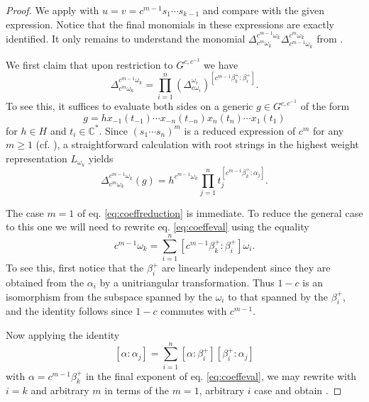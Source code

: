 \documentclass[12pt]{amsart}
\newcommand{\CC}{\mathbb{C}}
\numberwithin{equation}{section}
\begin{document}
  \begin{proof}
    We apply  with $u = v = c^{m-1}s_1 \cdots s_{k-1}$ and compare with the given expression.  Notice that the final monomials in these expressions are exactly identified.  It only remains to understand the monomial $\Delta_{c^m \omega_k}^{c^{m-1} \omega_k}\Delta_{c^{m-1} \omega_k}^{c^m \omega_k}$ from .

    We first claim that upon restriction to $G^{c,c^{-1}}$ we have
    \begin{equation}\label{eq:coeffreduction}
      \Delta_{c^m \omega_k}^{c^{m-1} \omega_k} = 
      \prod_{i=1}^n (\Delta_{c \omega_i}^{\omega_i})^{[c^{m-1}\beta_k^+:\beta_i^+]}.
    \end{equation}
    To see this, it suffices to evaluate both sides on a generic $g \in G^{c,c^{-1}}$ of the form
    \[
      g = hx_{-1}(t_{-1}) \cdots x_{-n}(t_{-n}) x_{n}(t_{n}) \cdots x_{1}(t_{1})
    \]
    for $h \in H$ and $t_i \in \CC^*$.  Since $(s_1 \cdots s_n)^m$ is a reduced expression of $c^m$ for any $m \geq 1$ (cf. \cite{Spe09}), a straightforward calculation with root strings in the highest weight representation $L_{\omega_k}$ yields
    \begin{equation}\label{eq:coeffeval}
      \Delta_{c^m \omega_k}^{c^{m-1}\omega_k}(g) = h^{c^{m-1}\omega_k} \prod_{j=1}^n t_j^{[c^{m-1}\beta_k^+:\alpha_j]}.
    \end{equation}
    
    The case $m=1$ of eq. \eqref{eq:coeffreduction} is immediate.  To reduce the general case to this one we will need to rewrite eq. \eqref{eq:coeffeval} using the equality
    \[
      c^{m-1} \omega_k = \sum_{i=1}^n [c^{m-1}\beta_k^+:\beta_i^+]\omega_i.
    \]
    To see this, first notice that the $\beta_i^+$ are linearly independent since they are obtained from the $\alpha_i$ by a unitriangular transformation.  Thus $1-c$ is an isomorphism from the subspace spanned by the $\omega_i$ to that spanned by the $\beta_i^+$, and the identity follows since $1-c$ commutes with $c^{m-1}$.  

    Now applying the identity
    \[
      [\alpha:\alpha_j] = \sum_{i=1}^n [\alpha:\beta_i^+][\beta_i^+:\alpha_j]
    \]
    with $\alpha=c^{m-1}\beta_k^+$ in the final exponent of eq. \eqref{eq:coeffeval},
    we may rewrite  with $i = k$ and arbitrary $m$ in terms of the $m = 1$, arbitrary $i$ case and obtain .


\end{proof}
\end{document}
